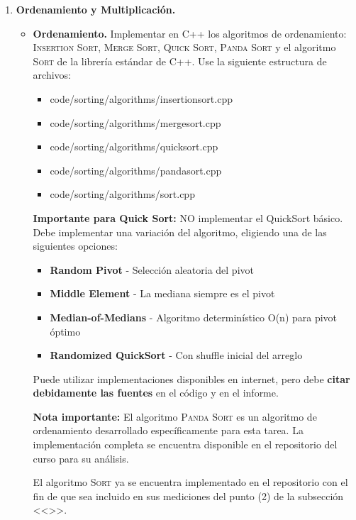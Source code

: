 \begin{enumerate}[(1)]
    \item \textbf{Ordenamiento y Multiplicación.}
    \begin{itemize}
        \item \textbf{Ordenamiento.}  Implementar en C++ los algoritmos de ordenamiento: \textsc{Insertion Sort}, \textsc{Merge Sort}, \textsc{Quick Sort}, \textsc{Panda Sort} y el algoritmo \textsc{Sort} de la librería estándar de C++. Use la siguiente estructura de archivos:
        
    \begin{itemize}
        \item code/sorting/algorithms/insertionsort.cpp
        \item code/sorting/algorithms/mergesort.cpp
        \item code/sorting/algorithms/quicksort.cpp
        \item code/sorting/algorithms/pandasort.cpp
        \item code/sorting/algorithms/sort.cpp
    \end{itemize}

        \textbf{Importante para Quick Sort:} NO implementar el QuickSort básico. Debe implementar una variación del algoritmo, eligiendo una de las siguientes opciones:
        \begin{itemize}
            \item \textbf{Random Pivot} - Selección aleatoria del pivot
            \item \textbf{Middle Element} - La mediana siempre es el pivot
            \item \textbf{Median-of-Medians} - Algoritmo determinístico O(n) para pivot óptimo
            \item \textbf{Randomized QuickSort} - Con shuffle inicial del arreglo
        \end{itemize}
        
        Puede utilizar implementaciones disponibles en internet, pero debe \textbf{citar debidamente las fuentes} en el código y en el informe. 
    
    \textbf{Nota importante:} El algoritmo \textsc{Panda Sort} es un algoritmo de ordenamiento desarrollado específicamente para esta tarea. La implementación completa se encuentra disponible en el repositorio del curso para su análisis.
    
    El algoritmo \textsc{Sort} ya se encuentra implementado en el repositorio con el fin de que sea incluido en sus mediciones del punto (2) de la subsección <<>>.
    

\end{itemize}
\end{enumerate}
